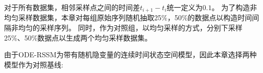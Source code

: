 
对于所有数据集，相邻采样点之间的时间差$t_{i+1}-t_i$统一定义为$0.1$。
为了构造非均匀采样数据集，本章对每组原始序列随机抽取25\%，50\%的数据点以构造时间间隔非均匀的采样序列。
同时，作为对照组，以均匀采样的方式，分别下采样25\%、50\%数据点以生成两个均匀采样数据集。





由于ODE-RSSM为带有随机隐变量的连续时间状态空间模型，因此本章选择两种模型作为对照基线:

